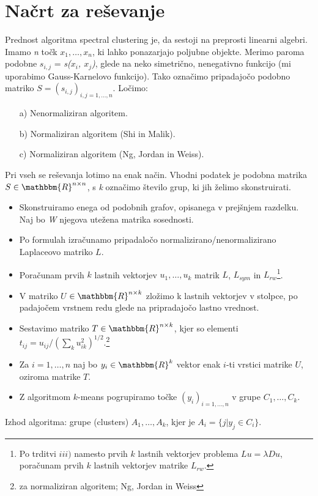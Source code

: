 \documentclass[a4paper, 10pt]{article}
\begin{document}
\section{Načrt za reševanje}
Prednost algoritma spectral clustering je, da sestoji na preprosti linearni algebri. Imamo \textsl{n} točk $x_1,\ldots ,x_n$, ki lahko ponazarjajo poljubne objekte. Merimo paroma podobne  \textsl{$s_{i,j}$} =  \textsl{s($x_i$, $x_j$)}, glede na neko simetrično, nenegativno funkcijo (mi uporabimo Gauss-Karnelovo funkcijo). Tako označimo pripadajočo podobno matriko $S=(s_{i,j})_{i,j = 1,..., n}$. Ločimo:
\begin{itemize}
\item[a)] Nenormaliziran algoritem.
\item[b)] Normaliziran algoritem (Shi in Malik).
\item[c)] Normaliziran algoritem (Ng, Jordan in Weiss).
\end{itemize}
Pri vseh se reševanja lotimo na enak način. Vhodni podatek je podobna matrika $S\in\mathbbm{ R}^{n\times n}$, s  \textsl{k} označimo število grup, ki jih želimo skonstruirati.
\begin{itemize}
\item Skonstruiramo enega od podobnih grafov, opisanega v prejšnjem razdelku. Naj bo \textsl{W} njegova utežena matrika sosednosti. 
\item Po formulah izračunamo pripadaločo normalizirano/nenormalizirano Laplaceovo matriko $L$.
\item Poračunam prvih $k$ lastnih vektorjev $u_{1},\ldots,u_{k}$ matrik $L$, $L_{sym}$ in $L_{rw}$\footnote{Po trditvi $iii)$ namesto prvih $k$ lastnih vektorjev problema $Lu=\lambda Du$, poračunam prvih $k$ lastnih vektorjev matrike $L_{rw}$.}.
\item V matriko $U$ $\in \mathbbm{R}^{n \times k}$ zložimo k lastnih vektorjev v stolpce, po padajočem vrstnem redu glede na pripradajočo lastno vrednost.
\item Sestavimo matriko $T\in \mathbbm{R}^{n\times k}$, kjer so elementi $t_{ij}=u_{ij}/(\sum_{k}u_{ik}^2)^{1/2}.$\footnote{za normaliziran algoritem; Ng, Jordan in Weiss}
\item Za $i=1,\ldots,n$ naj bo $y_{i}\in\mathbbm{R}^k$ vektor enak $i$-ti vrstici matrike $U$, oziroma matrike $T$.
\item Z algoritmom $k$-means pogrupiramo točke $(y_{i})_{i=1,\ldots,n}$ v grupe $C_{1},\ldots,C_{k}$.
\end{itemize}
Izhod algoritma: grupe (clusters)  $A_{1},\ldots, A_{k}$, kjer je $A_{i}=\{j|y_{j}\in C_{i}\}$.
\end{document}
